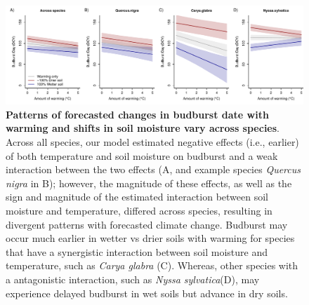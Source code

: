 \documentclass{article}
\begin{document}
 \begin{figure}[h]
\centering
 \includegraphics{../../Analyses/soilmoisture/figures/tempforecast_bb_0_5_135_28_105_4_degwarm.pdf}
 
 \caption{\textbf{Patterns of forecasted changes in budburst date with warming and shifts in soil moisture vary across species}. Across all species, our model estimated negative effects (i.e., earlier) of both temperature and soil moisture on budburst and a weak interaction between the two effects (A, and example species \textit{Quercus nigra} in B); however, the magnitude of these effects, as well as the sign and magnitude of the estimated interaction between soil moisture and temperature, differed across species, resulting in divergent patterns with forecasted climate change. Budburst may occur much earlier in wetter vs drier soils with warming for species that have a synergistic interaction between soil moisture and temperature, such as \textit{Carya glabra} (C). Whereas, other species with a antagonistic interaction, such as \textit{Nyssa sylvatica}(D), may experience delayed budburst in wet soils but advance in dry soils.}
 \label{fig:bbsp}
 \end{figure}

\end{document}
